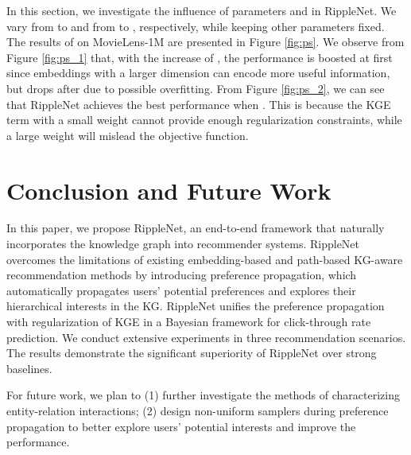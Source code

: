 \documentclass[sigconf]{acmart}
\begin{document}
        In this section, we investigate the influence of parameters  and  in RippleNet.
        We vary  from  to  and  from  to , respectively, while keeping other parameters fixed.
        The results of  on MovieLens-1M are presented in Figure \ref{fig:ps}.
        We observe from Figure \ref{fig:ps_1} that, with the increase of , the performance is boosted at first since embeddings with a larger dimension can encode more useful information, but drops after  due to possible overfitting.
        From Figure \ref{fig:ps_2}, we can see that RippleNet achieves the best performance when .
        This is because the KGE term with a small weight cannot provide enough regularization constraints, while a large weight will mislead the objective function.		


\section{Conclusion and Future Work}
\label{section_conclusions}
	In this paper, we propose RippleNet, an end-to-end framework that naturally incorporates the knowledge graph into recommender systems.
	RippleNet overcomes the limitations of existing embedding-based and path-based KG-aware recommendation methods by introducing preference propagation, which automatically propagates users' potential preferences and explores their hierarchical interests in the KG.
	RippleNet unifies the preference propagation with regularization of KGE in a Bayesian framework for click-through rate prediction.
	We conduct extensive experiments in three recommendation scenarios.
	The results demonstrate the significant superiority of RippleNet over strong baselines.
	
	For future work, we plan to (1) further investigate the methods of characterizing entity-relation interactions; (2) design non-uniform samplers during preference propagation to better explore users' potential interests and improve the performance.
	





 
\end{document}
